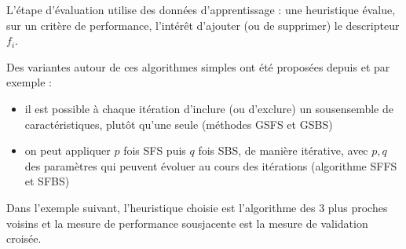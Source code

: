 \documentclass[letterpaper,10pt,french]{sphinxmanual}
\begin{document}
\sphinxAtStartPar
L’étape d’évaluation utilise des données d’apprentissage : une heuristique évalue, sur un critère de performance, l’intérêt d’ajouter (ou de supprimer) le descripteur \(f_i\).

\sphinxAtStartPar
Des variantes autour de ces algorithmes simples ont été proposées depuis et par exemple :
\begin{itemize}
\item {} 
\sphinxAtStartPar
il est possible à chaque itération d’inclure (ou d’exclure) un sous\sphinxhyphen{}ensemble de caractéristiques, plutôt qu’une seule (méthodes GSFS et GSBS)

\item {} 
\sphinxAtStartPar
on peut appliquer \(p\) fois SFS puis \(q\) fois SBS, de manière itérative, avec \(p,q\) des paramètres qui peuvent évoluer au cours des itérations (algorithme SFFS et SFBS)

\end{itemize}

\sphinxAtStartPar
Dans l’exemple suivant, l’heuristique choisie est l’algorithme des 3 plus proches voisins et la mesure de performance sous\sphinxhyphen{}jacente est la mesure de validation croisée.
\end{document}
